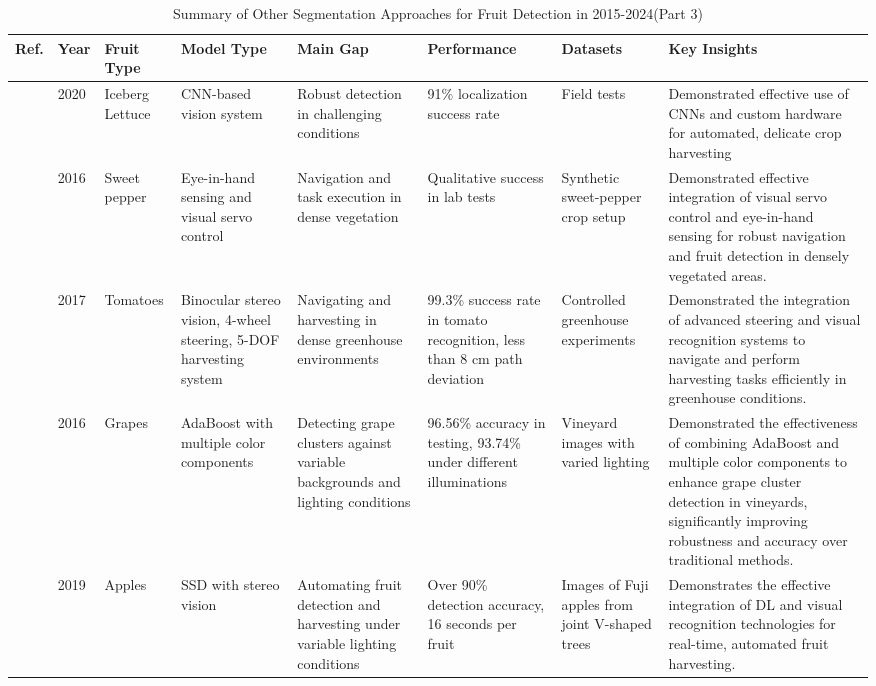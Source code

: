\documentclass[a4paper,fleqn]{cas-dc}
\begin{document}
\begin{table}[htbp]
	\centering
	\footnotesize 
	\addtocounter{table}{-1}
	\caption{Summary of Other Segmentation Approaches for Fruit Detection in 2015-2024(Part 3)} 
	\label{tab:machinelearning-based} 
	\begin{tabular}{@{}p{0.4cm}p{0.4cm}p{1.4cm}p{1.4cm}p{2cm}p{2cm}p{2cm}p{4.5cm}@{}}
	\toprule
	\textbf{Ref.} & \textbf{Year} & \textbf{Fruit Type} & \textbf{Model Type} & \textbf{Main Gap} & \textbf{Performance} & \textbf{Datasets} & \textbf{Key Insights} \\ \midrule
\cite{birrell2020field} & 2020 & Iceberg Lettuce & CNN-based vision system & Robust detection in challenging conditions & 91\% localization success rate & Field tests & Demonstrated effective use of CNNs and custom hardware for automated, delicate crop harvesting \\ \midrule
\cite{barth2016design} & 2016 & Sweet pepper & Eye-in-hand sensing and visual servo control & Navigation and task execution in dense vegetation & Qualitative success in lab tests & Synthetic sweet-pepper crop setup & Demonstrated effective integration of visual servo control and eye-in-hand sensing for robust navigation and fruit detection in densely vegetated areas. \\ \midrule
\cite{lili2017development} & 2017 & Tomatoes & Binocular stereo vision, 4-wheel steering, 5-DOF harvesting system & Navigating and harvesting in dense greenhouse environments & 99.3\% success rate in tomato recognition, less than 8 cm path deviation & Controlled greenhouse experiments & Demonstrated the integration of advanced steering and visual recognition systems to navigate and perform harvesting tasks efficiently in greenhouse conditions. \\ \midrule
\cite{luo2016robust} & 2016 & Grapes & AdaBoost with multiple color components & Detecting grape clusters against variable backgrounds and lighting conditions & 96.56\% accuracy in testing, 93.74\% under different illuminations & Vineyard images with varied lighting & Demonstrated the effectiveness of combining AdaBoost and multiple color components to enhance grape cluster detection in vineyards, significantly improving robustness and accuracy over traditional methods. \\ \midrule
\cite{onishi2019automated} & 2019 & Apples & SSD with stereo vision & Automating fruit detection and harvesting under variable lighting conditions & Over 90\% detection accuracy, 16 seconds per fruit & Images of Fuji apples from joint V-shaped trees & Demonstrates the effective integration of DL and visual recognition technologies for real-time, automated fruit harvesting. \\ \midrule

\end{tabular}
\end{table}
\end{document}
